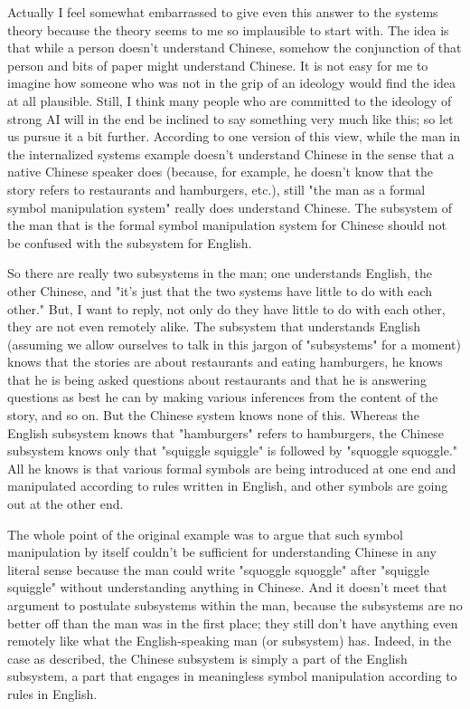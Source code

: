 Actually I feel somewhat embarrassed to give even this answer to the systems theory because the theory seems
to me so implausible to start with. The idea is that while a person doesn't understand Chinese, somehow the
conjunction of that person and bits of paper might understand Chinese. It is not easy for me to imagine how
someone who was not in the grip of an ideology would find the idea at all plausible. Still, I think many people
who are committed to the ideology of strong AI will in the end be inclined to say something very much like this;
so let us pursue it a bit further. According to one version of this view, while the man in the internalized systems
example doesn't understand Chinese in the sense that a native Chinese speaker does (because, for example, he
doesn't know that the story refers to restaurants and hamburgers, etc.), still "the man as a formal symbol
manipulation system" really does understand Chinese. The subsystem of the man that is the formal symbol
manipulation system for Chinese should not be confused with the subsystem for English.

So there are really two subsystems in the man; one understands English, the other Chinese, and "it's just that the two systems have little to do with each other." But, I want to reply, not only do they have little to do with each other, they are not even remotely alike. The subsystem that understands English (assuming we allow ourselves
to talk in this jargon of "subsystems" for a moment) knows that the stories are about restaurants and eating
hamburgers, he knows that he is being asked questions about restaurants and that he is answering questions as
best he can by making various inferences from the content of the story, and so on. But the Chinese system
knows none of this. Whereas the English subsystem knows that "hamburgers" refers to hamburgers, the Chinese
subsystem knows only that "squiggle squiggle" is followed by "squoggle squoggle." All he knows is that various
formal symbols are being introduced at one end and manipulated according to rules written in English, and other
symbols are going out at the other end.

The whole point of the original example was to argue that such symbol manipulation by itself couldn't be
sufficient for understanding Chinese in any literal sense because the man could write "squoggle squoggle" after
"squiggle squiggle" without understanding anything in Chinese. And it doesn't meet that argument to postulate
subsystems within the man, because the subsystems are no better off than the man was in the first place; they
still don't have anything even remotely like what the English-speaking man (or subsystem) has. Indeed, in the
case as described, the Chinese subsystem is simply a part of the English subsystem, a part that engages in
meaningless symbol manipulation according to rules in English.

